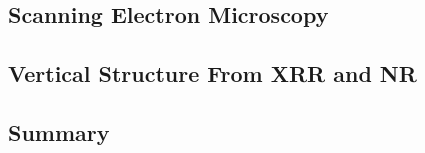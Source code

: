 \documentclass[\main/dresen_thesis.tex]{subfiles}
\renewcommand{\thisPath}{\main/chapters/doublelayers/structuralCharacterization}
\begin{document}
  \subsection{Scanning Electron Microscopy}
  
    \FloatBarrier

  \subsection{Vertical Structure From XRR and NR}
  
    \FloatBarrier

  \subsection{Summary}
  
    \FloatBarrier
\end{document}
